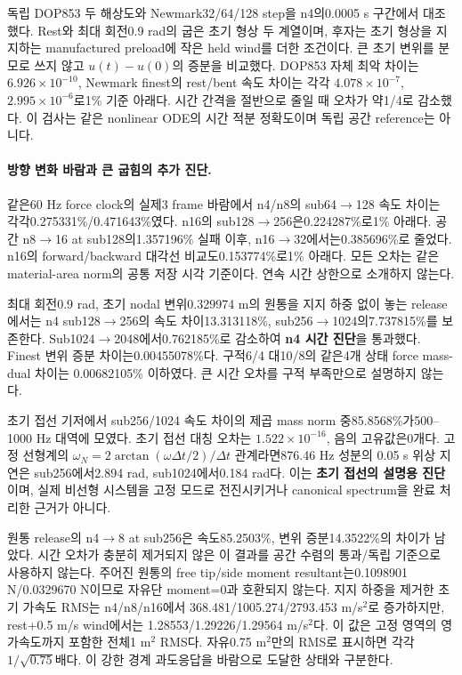\documentclass[10pt]{article}
\begin{document}
독립 DOP853 두 해상도와 Newmark32/64/128 step을 n4의0.0005 s 구간에서 대조했다.
Rest와 최대 회전0.9 rad의 굽은 초기 형상 두 계열이며, 후자는 초기 형상을 지지하는
manufactured preload에 작은 held wind를 더한 조건이다. 큰 초기 변위를 분모로 쓰지 않고
\(u(t)-u(0)\)의 증분을 비교했다. DOP853 자체 최악 차이는 \(6.926\times10^{-10}\),
Newmark finest의 rest/bent 속도 차이는 각각 \(4.078\times10^{-7}\),
\(2.995\times10^{-6}\)로1\% 기준 아래다. 시간 간격을 절반으로 줄일 때 오차가 약1/4로 감소했다.
이 검사는 같은 nonlinear ODE의 시간 적분 정확도이며 독립 공간 reference는 아니다.

\paragraph{방향 변화 바람과 큰 굽힘의 추가 진단.}
같은60 Hz force clock의 실제3 frame 바람에서 n4/n8의 sub64$\to$128 속도 차이는
각각0.275331\%/0.471643\%였다. n16의 sub128$\to$256은0.224287\%로1\% 아래다.
공간 n8$\to$16 at sub128의1.357196\% 실패 이후, n16$\to$32에서는0.385696\%로 줄었다.
n16의 forward/backward 대각선 비교도0.153774\%로1\% 아래다.
모든 오차는 같은 material-area norm의 공통 저장 시각 기준이다. 연속 시간 상한으로 소개하지 않는다.

최대 회전0.9 rad, 초기 nodal 변위0.329974 m의 원통을 지지 하중 없이 놓는 release에서는
n4 sub128$\to$256의 속도 차이13.313118\%, sub256$\to$1024의7.737815\%를 보존한다.
Sub1024$\to$2048에서0.762185\%로 감소하여 \textbf{n4 시간 진단}을 통과했다.
Finest 변위 증분 차이는0.00455078\%다. 구적6/4 대10/8의 같은4개 상태 force mass-dual 차이는
0.00682105\% 이하였다. 큰 시간 오차를 구적 부족만으로 설명하지 않는다.

초기 접선 기저에서 sub256/1024 속도 차이의 제곱 mass norm 중85.8568\%가500--1000 Hz 대역에
모였다. 초기 접선 대칭 오차는 \(1.522\times10^{-16}\), 음의 고유값은0개다.
고정 선형계의 \(\omega_N=2\arctan(\omega\Delta t/2)/\Delta t\) 관계라면876.46 Hz 성분의
0.05 s 위상 지연은 sub256에서2.894 rad, sub1024에서0.184 rad다. 이는 \textbf{초기 접선의 설명용 진단}이며,
실제 비선형 시스템을 고정 모드로 전진시키거나 canonical spectrum을 완료 처리한 근거가 아니다.

원통 release의 n4$\to$8 at sub256은 속도85.2503\%, 변위 증분14.3522\%의 차이가 남았다.
시간 오차가 충분히 제거되지 않은 이 결과를 공간 수렴의 통과/독립 기준으로 사용하지 않는다.
주어진 원통의 free tip/side moment resultant는0.1098901 N/0.0329670 N이므로 자유단 moment=0과
호환되지 않는다. 지지 하중을 제거한 초기 가속도 RMS는 n4/n8/n16에서
368.481/1005.274/2793.453 m/s$^2$로 증가하지만, rest+0.5 m/s wind에서는
1.28553/1.29226/1.29564 m/s$^2$다. 이 값은 고정 영역의 영 가속도까지 포함한 전체1 m$^2$ RMS다.
자유0.75 m$^2$만의 RMS로 표시하면 각각 \(1/\sqrt{0.75}\)배다.
이 강한 경계 과도응답을 바람으로 도달한 상태와 구분한다.
\end{document}
